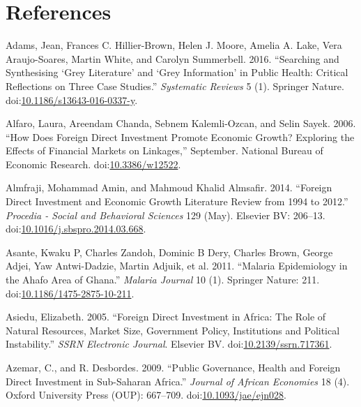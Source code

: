 \documentclass[]{article}
\begin{document}
\section*{References}\label{references}

\hypertarget{refs}{}
\hypertarget{ref-Adams2016}{}
Adams, Jean, Frances C. Hillier-Brown, Helen J. Moore, Amelia A. Lake,
Vera Araujo-Soares, Martin White, and Carolyn Summerbell. 2016.
``Searching and Synthesising `Grey Literature' and `Grey Information' in
Public Health: Critical Reflections on Three Case Studies.''
\emph{Systematic Reviews} 5 (1). Springer Nature.
doi:\href{https://doi.org/10.1186/s13643-016-0337-y}{10.1186/s13643-016-0337-y}.

\hypertarget{ref-Alfaro_2006}{}
Alfaro, Laura, Areendam Chanda, Sebnem Kalemli-Ozcan, and Selin Sayek.
2006. ``How Does Foreign Direct Investment Promote Economic Growth?
Exploring the Effects of Financial Markets on Linkages,'' September.
National Bureau of Economic Research.
doi:\href{https://doi.org/10.3386/w12522}{10.3386/w12522}.

\hypertarget{ref-Almfraji_2014}{}
Almfraji, Mohammad Amin, and Mahmoud Khalid Almsafir. 2014. ``Foreign
Direct Investment and Economic Growth Literature Review from 1994 to
2012.'' \emph{Procedia - Social and Behavioral Sciences} 129 (May).
Elsevier BV: 206--13.
doi:\href{https://doi.org/10.1016/j.sbspro.2014.03.668}{10.1016/j.sbspro.2014.03.668}.

\hypertarget{ref-Asante_2011}{}
Asante, Kwaku P, Charles Zandoh, Dominic B Dery, Charles Brown, George
Adjei, Yaw Antwi-Dadzie, Martin Adjuik, et al. 2011. ``Malaria
Epidemiology in the Ahafo Area of Ghana.'' \emph{Malaria Journal} 10
(1). Springer Nature: 211.
doi:\href{https://doi.org/10.1186/1475-2875-10-211}{10.1186/1475-2875-10-211}.

\hypertarget{ref-Asiedu_2005}{}
Asiedu, Elizabeth. 2005. ``Foreign Direct Investment in Africa: The Role
of Natural Resources, Market Size, Government Policy, Institutions and
Political Instability.'' \emph{SSRN Electronic Journal}. Elsevier BV.
doi:\href{https://doi.org/10.2139/ssrn.717361}{10.2139/ssrn.717361}.

\hypertarget{ref-Azemar2009}{}
Azemar, C., and R. Desbordes. 2009. ``Public Governance, Health and
Foreign Direct Investment in Sub-Saharan Africa.'' \emph{Journal of
African Economies} 18 (4). Oxford University Press (OUP): 667--709.
doi:\href{https://doi.org/10.1093/jae/ejn028}{10.1093/jae/ejn028}.
\end{document}
